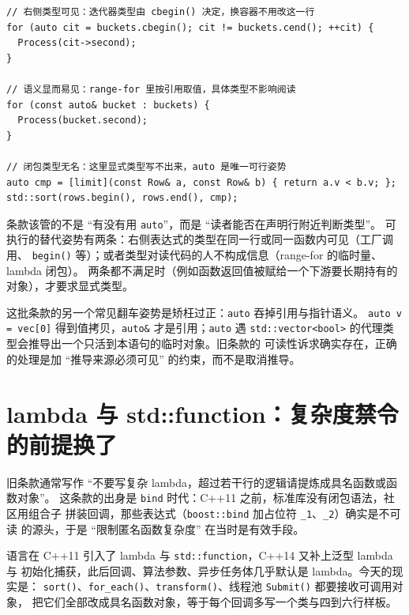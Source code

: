 \documentclass[12pt,a4paper,fontset=fandol]{ctexbook}
\newcommand{\cpp}[1]{C++#1}
\newcommand{\Fn}[1]{\texttt{#1()}}
\newcommand{\Tp}[1]{\texttt{#1}}
\newcommand{\Bk}{\discretionary{}{}{}}
\begin{document}
\begin{lstlisting}[style=cppstyle,caption={同一逻辑的现代姿势：右侧类型可见或语义显而易见},label={lst:ch12-auto-modern}]
// 右侧类型可见：迭代器类型由 cbegin() 决定，换容器不用改这一行
for (auto cit = buckets.cbegin(); cit != buckets.cend(); ++cit) {
  Process(cit->second);
}

// 语义显而易见：range-for 里按引用取值，具体类型不影响阅读
for (const auto& bucket : buckets) {
  Process(bucket.second);
}

// 闭包类型无名：这里显式类型写不出来，auto 是唯一可行姿势
auto cmp = [limit](const Row& a, const Row& b) { return a.v < b.v; };
std::sort(rows.begin(), rows.end(), cmp);
\end{lstlisting}

\begin{guideline}[title={把 \Tp{auto} 条款改写成可见性条款}]
条款该管的不是 ``有没有用 \Tp{auto}''，而是 ``读者能否在声明行附近判断类型''。
可执行的替代姿势有两条：右侧表达式的类型在同一行或同一函数内可见（工厂调用、
\Fn{begin} 等）；或者类型对读代码的人不构成信息（range-for 的临时量、lambda 闭包）。
两条都不满足时（例如函数返回值被赋给一个下游要长期持有的对象），才要求显式类型。
\end{guideline}

\begin{warning}[title={从 ``禁用 \Tp{auto}'' 直接跳到 ``处处 \Tp{auto}''}]
这批条款的另一个常见翻车姿势是矫枉过正：\Tp{auto} 吞掉引用与指针语义。
\Tp{auto v = vec[0]} 得到值拷贝，\Tp{auto\&} 才是引用；\Tp{auto} 遇
\Tp{std::{\Bk}vector<bool>} 的代理类型会推导出一个只活到本语句的临时对象。旧条款的
可读性诉求确实存在，正确的处理是加 ``推导来源必须可见'' 的约束，而不是取消推导。
\end{warning}

\section{lambda 与 std::function：复杂度禁令的前提换了}
\label{sec:ch12-lambda}

旧条款通常写作 ``不要写复杂 lambda，超过若干行的逻辑请提炼成具名函数或函数对象''。
这条款的出身是 \Tp{bind} 时代：\cpp{11} 之前，标准库没有闭包语法，社区用组合子
拼装回调，那些表达式（\Tp{boost::{\Bk}bind} 加占位符 \Tp{\_1}、\Tp{\_2}）确实是不可读
的源头，于是 ``限制匿名函数复杂度'' 在当时是有效手段。

语言在 \cpp{11} 引入了 lambda 与 \Tp{std::{\Bk}function}，\cpp{14} 又补上泛型 lambda 与
初始化捕获，此后回调、算法参数、异步任务体几乎默认是 lambda。今天的现实是：
\Fn{sort}、\Fn{for\_each}、\Fn{transform}、线程池 \Fn{Submit} 都要接收可调用对象，
把它们全部改成具名函数对象，等于每个回调多写一个类与四到六行样板。
\end{document}
